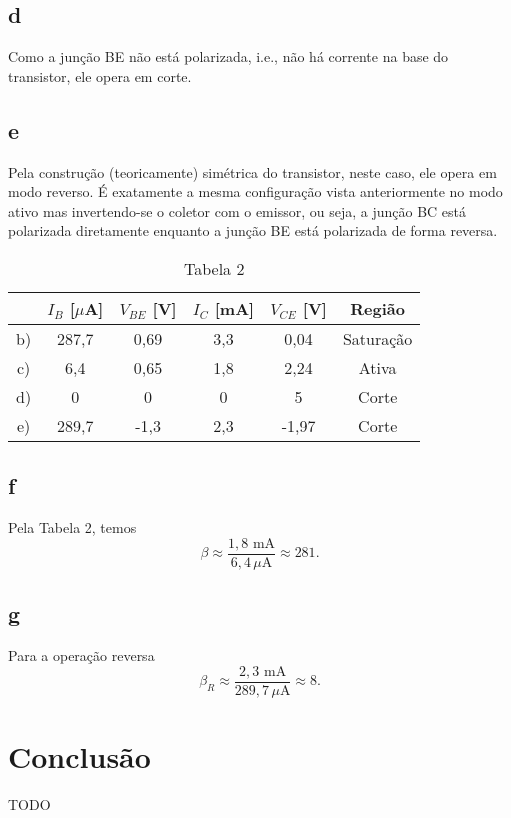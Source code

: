 \documentclass[a4paper]{report}
\begin{document}
\subsection*{d}

Como a junção BE não está polarizada, i.e., não há corrente na base do transistor, ele opera em corte.

\subsection*{e}

Pela construção (teoricamente) simétrica do transistor, neste caso, ele opera em modo reverso. É exatamente a mesma configuração vista anteriormente no modo ativo mas invertendo-se o coletor com o emissor, ou seja, a junção BC está polarizada diretamente enquanto a junção BE está polarizada de forma reversa.

\begin{table}[H]
    \centering
    \caption*{Tabela 2}
    \begin{tabular}{c | c | c | c | c | c}
     & $I_B$ [$\mu$A] & $V_{BE}$ [V] & $I_C$ [mA] & $V_{CE}$ [V] & Região \\
     \hline
	b) & 287,7 & 0,69 & 3,3 & 0,04 & Saturação \\
	c) & 6,4 & 0,65 & 1,8 & 2,24 & Ativa \\
	d) & 0 & 0 & 0 & 5 & Corte \\
	e) & 289,7 & -1,3 & 2,3 & -1,97 & Corte \\
    \end{tabular}
\end{table}

\subsection*{f}

Pela Tabela 2, temos \[
\beta \approx \frac{1,8 \text{ mA}}{6,4\,\mu\text{A}} \approx 281
.\]

\subsection*{g}

Para a operação reversa \[
\beta_R \approx \frac{2,3 \text{ mA}}{289,7\,\mu\text{A}} \approx 8
.\] 

\section{Conclusão}

TODO
\end{document}
